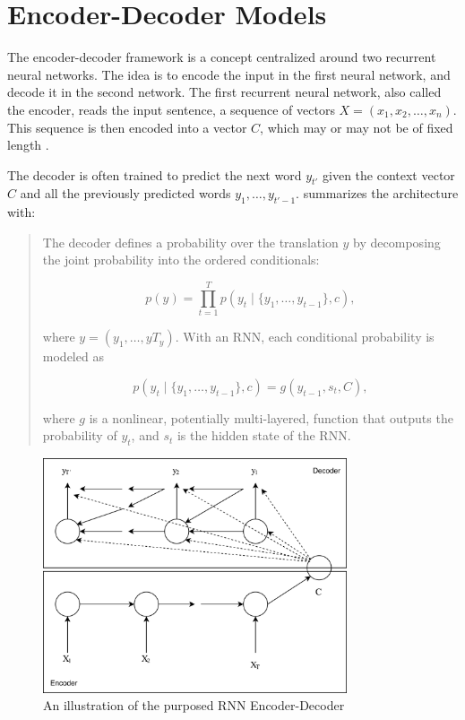 
\section{Encoder-Decoder Models}
\label{sec:encoder-decoder}
The encoder-decoder framework is a concept centralized around two recurrent neural networks. The idea is to encode the input in the first neural network, and decode it in the second network. The first recurrent neural network, also called the encoder, reads the input sentence, a sequence of vectors \(X = (x_{1}, x_{2}, \ldots, x_{n})\). This sequence is then encoded into a vector \(C\), which may or may not be of fixed length \citep{sutskever2014sequence, cho2014learning}. 

The decoder is often trained to predict the next word \(y_{t'}\) given the context vector \(C\) and all the previously predicted words \({y_1, \ldots, y_{t'-1}}\). \citep{bahdanau2014neural} summarizes the architecture with:

\begin{quote}
    The decoder defines a probability over the translation \(y\) by decomposing the joint probability into the ordered conditionals:
    
    \begin{equation}
        p(y)=\prod_{t=1}^{T} p(y_t \mid \{y_1, \ldots, y_{t-1}\}, c),
    \end{equation}
    
    where \(y = (y_1, \ldots, yT_y)\). With an RNN, each conditional probability is modeled as
    
    \begin{equation}
        p(y_t \mid \{y_1, \ldots, y_{t-1} \}, c) = g(y_{t-1}, s_t, C),
    \end{equation}
    
    where \(g\) is a nonlinear, potentially multi-layered, function that outputs the probability of \(y_t\), and \(s_t\) is the hidden state of the RNN.
    
\end{quote}

\begin{figure}[ht]
    \centering
    \includegraphics[width=0.8\textwidth]{fig/background_theory/encoder-decoder.png}
    \caption{An illustration of the purposed RNN Encoder-Decoder}
    \label{fig:purposed-encoder-decoder}
\end{figure}

